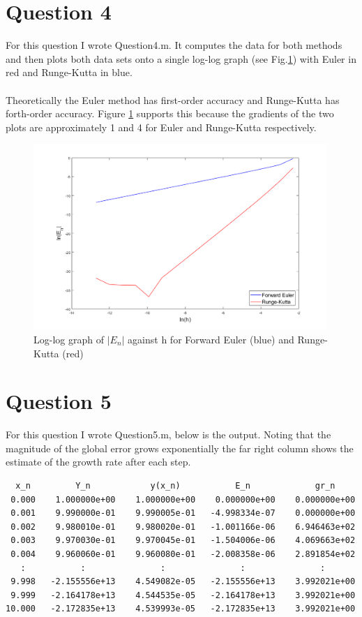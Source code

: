 \documentclass[a4paper]{article}
\begin{document}
\section*{Question 4}
For this question I wrote Question\textunderscore4.m. It computes the data for both methods and then plots both data sets onto a single log-log graph (see Fig.\ref{FQ4}) with Euler in red and Runge-Kutta in blue. \\ \\
Theoretically the Euler method has first-order accuracy and Runge-Kutta has forth-order accuracy. Figure \ref{FQ4} supports this because the gradients of the two plots are approximately 1 and 4 for Euler and Runge-Kutta respectively.
\begin{figure}[H]
\centering
\includegraphics[width=0.99\textwidth]{Q4_both.png}
\caption{Log-log graph of $|E_n|$ against h for Forward Euler (blue) and Runge-Kutta (red)}
\label{FQ4}
\end{figure}

\section*{Question 5}
For this question I wrote Question\textunderscore5.m, below is the output. Noting that the magnitude of the global error grows exponentially the far right column shows the estimate of the growth rate after each step. \\
\begin{table}[H]
\begin{verbatim}
  x_n         Y_n            y(x_n)           E_n             gr_n 
 0.000    1.000000e+00    1.000000e+00    0.000000e+00    0.000000e+00 
 0.001    9.990000e-01    9.990005e-01   -4.998334e-07    0.000000e+00 
 0.002    9.980010e-01    9.980020e-01   -1.001166e-06    6.946463e+02 
 0.003    9.970030e-01    9.970045e-01   -1.504006e-06    4.069663e+02 
 0.004    9.960060e-01    9.960080e-01   -2.008358e-06    2.891854e+02 
   :           :               :               :               : 
 9.998   -2.155556e+13    4.549082e-05   -2.155556e+13    3.992021e+00 
 9.999   -2.164178e+13    4.544535e-05   -2.164178e+13    3.992021e+00 
10.000   -2.172835e+13    4.539993e-05   -2.172835e+13    3.992021e+00
\end{verbatim}
\caption{Output from Question\textunderscore5.m}
\end{table}
\end{document}
